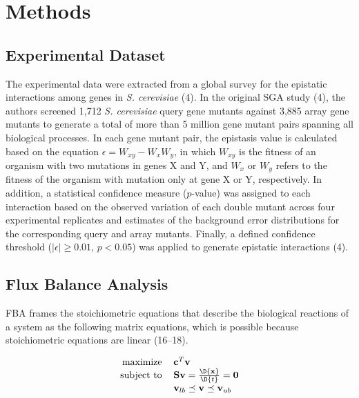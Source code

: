 \section{Methods}
\subsection{Experimental Dataset}
The experimental data were extracted from a global survey for the
epistatic interactions among genes in \textit{S. cerevisiae} (4). In
the original SGA study (4), the authors screened 1,712 \textit{S. cerevisiae}
query gene mutants against 3,885 array gene mutants to generate a
total of more than 5 million gene mutant pairs spanning all biological
processes. In each gene mutant pair, the epistasis value is calculated
based on the equation $\epsilon = W_{xy} − W_xW_y$, in which $W_{xy}$
is the fitness of an organism with two mutations in genes X and Y, and
$W_x$ or $W_y$ refers to the fitness of the organism with mutation
only at gene X or Y, respectively. In addition, a statistical
confidence measure ($p$-value) was assigned to each interaction based on
the observed variation of each double mutant across four experimental
replicates and estimates of the background error distributions for the
corresponding query and array mutants. Finally, a defined confidence
threshold ($\left|\epsilon\right| \geq 0.01$, $p < 0.05$) was applied
to generate epistatic interactions (4).

\subsection{Flux Balance Analysis}

FBA frames the stoichiometric equations that describe the biological
reactions of a system as the following matrix equations, which is
possible because stoichiometric equations are linear (16--18).

\begin{equation}
\centering
\begin{tabular}{rl}
maximize   & $\mathbf{c}^T\mathbf{v}$                                     \\
subject to & $\mathbf{S v} = \frac{\D{\mathbf{x}}}{\D{t}} = \mathbf{0}$   \\
           & $\mathbf{v}_{lb} \preceq \mathbf{v} \preceq \mathbf{v}_{ub}$ \\
\end{tabular}
\end{equation}

